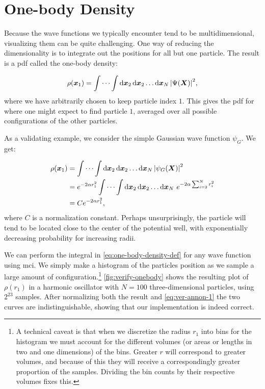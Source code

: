 \documentclass[Thesis.tex]{subfiles}
\begin{document}
\section{One-body Density}

Because the wave functions we typically encounter tend to be multidimensional,
visualizing them can be quite challenging. One way of reducing the
dimensionality is to integrate out the positions for all but one particle. The
result is a \gls{pdf} called the one-body density:

\begin{align}
  \label{eq:one-body-density-def}
  \rho(\bm{x}_1) = \idotsint \dd{\bm{x}_2}\dd{\bm{x}_2}\dots\dd{\bm{x}_N} \abs{\Psi(\bm{X})}^2,
\end{align}
where we have arbitrarily chosen to keep particle index $1$. This gives the
\gls{pdf} for where one might expect to find particle $1$,
averaged over all possible configurations of the other particles.

As a validating example, we consider the simple Gaussian wave function $\psi_G$.
We get:

\begin{align}
  \rho(\bm{x}_1) &= \idotsint \dd{\bm{x}_2}\dd{\bm{x}_2}\dots\dd{\bm{x}_N} \abs{\psi_G(\bm{X})}^2\\
  &= e^{-2\alpha r_1^2}\idotsint \dd{\bm{x}_2}\dd{\bm{x}_2}\dots\dd{\bm{x}_N} \,e^{-2\alpha\sum_{i=2}^N r_i^2}\\
    &= C e^{-2\alpha r_1^2},\label{eq:ver-annon-1}
\end{align}
where $C$ is a normalization constant. Perhaps unsurprisingly, the particle will
tend to be located close to the center of the potential well, with exponentially
decreasing probability for increasing radii.

We can perform the integral in \cref{eq:one-body-density-def} for any wave
function using \gls{mci}. We simply make a histogram of the
particles position as we sample a large amount of configuration.\footnote{A
technical caveat is that when we discretize the radius $r_1$ into bins for the
histogram we must account for the different volumes (or areas or lengths in two
and one dimensions) of the bins. Greater $r$ will correspond to greater volumes,
and because of this they will receive a correspondingly greater proportion of
the samples. Dividing the bin counts by their respective volumes fixes this.}
\cref{fig:verify-onebody} shows the resulting plot of $\rho(r_1)$ in a harmonic
oscillator with $N=100$ three-dimensional particles, using $2^{23}$
samples. After normalizing both the result and \cref{eq:ver-annon-1} the two
curves are indistinguishable, showing that our implementation is indeed correct.
\end{document}
